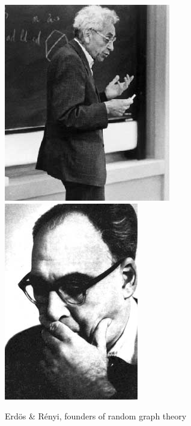 \documentclass[twoside]{article}
\begin{document}
\begin{figure}
  \centering
  {\label{fig:paul}\includegraphics[scale=0.3]{FIG/erdos.jpg}}                
  {\label{fig:alfred}\includegraphics[scale=0.3]{FIG/renyi2.jpg}}
  \caption{Erd\"os  \& R\'enyi, founders of random graph theory }
  \label{fig:erdosrenyi}
\end{figure}


\end{document}
